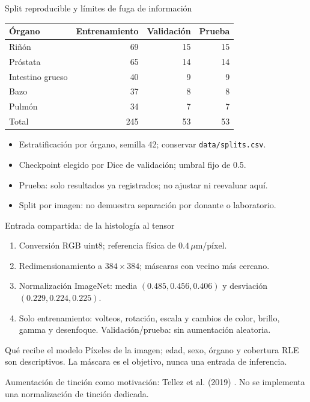 \documentclass[aspectratio=169,11pt]{beamer}
\begin{document}
\begin{frame}{Split reproducible y límites de fuga de información}
  \small
  \renewcommand{\arraystretch}{0.95}
  \centering
  \begin{tabular}{lrrr}
    \toprule
    Órgano & Entrenamiento & Validación & Prueba \\
    \midrule
    Riñón & 69 & 15 & 15 \\
    Próstata & 65 & 14 & 14 \\
    Intestino grueso & 40 & 9 & 9 \\
    Bazo & 37 & 8 & 8 \\
    Pulmón & 34 & 7 & 7 \\
    \midrule
    Total & 245 & 53 & 53 \\
    \bottomrule
  \end{tabular}
  \begin{itemize}
    \item Estratificación por órgano, semilla 42; conservar \texttt{data/splits.csv}.
    \item Checkpoint elegido por Dice de validación; umbral fijo de 0.5.
    \item Prueba: solo resultados ya registrados; no ajustar ni reevaluar aquí.
    \item Split por imagen: no demuestra separación por donante o laboratorio.
  \end{itemize}
\end{frame}

\begin{frame}{Entrada compartida: de la histología al tensor}
  \begin{enumerate}
    \item Conversión RGB uint8; referencia física de $0.4\,\mu$m/píxel.
    \item Redimensionamiento a $384\times384$; máscaras con vecino más cercano.
    \item Normalización ImageNet: media $(0.485,0.456,0.406)$ y
          desviación $(0.229,0.224,0.225)$.
    \item Solo entrenamiento: volteos, rotación, escala y cambios de color,
          brillo, gamma y desenfoque. Validación/prueba: sin aumentación aleatoria.
  \end{enumerate}
  \begin{block}{Qué recibe el modelo}
    Píxeles de la imagen; edad, sexo, órgano y cobertura RLE son descriptivos.
    La máscara es el objetivo, nunca una entrada de inferencia.
  \end{block}
  \small Aumentación de tinción como motivación: Tellez et al. (2019) \cite{tellez}.
  No se implementa una normalización de tinción dedicada.
\end{frame}
\end{document}
